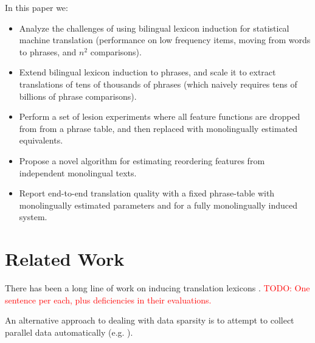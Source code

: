 \documentclass[11pt]{article}
\newcommand{\todo}[1]{\textcolor{red}{TODO: #1}}
\newcommand{\secref}[1]{Section~\ref{#1}}
\begin{document}

In this paper we:
\begin{itemize}
\item Analyze the challenges of using bilingual lexicon induction for statistical machine translation (performance on low frequency items, moving from words to phrases, and $n^2$ comparisons).
\item Extend bilingual lexicon induction to phrases, and scale it to extract translations of tens of thousands of  phrases (which naively requires tens of billions of phrase comparisons). 
\item Perform a set of lesion experiments where all feature functions are dropped from from a phrase table, and then replaced with monolingually estimated equivalents.
\item Propose a novel algorithm for estimating reordering features from independent monolingual texts.
\item Report end-to-end translation quality with a fixed phrase-table with monolingually estimated parameters and for a fully monolingually induced system.
\end{itemize}

\section{Related Work} \label{sect:related-work}

There has been a long line of work on inducing translation lexicons \cite{Rapp:1995,Rapp:1999}.
\todo{One sentence per each, plus deficiencies in their evaluations.}

An alternative approach to dealing with data sparsity is to attempt to collect parallel data automatically (e.g. \cite{Resnik:2003,Munteanu:2006,Smith:2010,Uszkoreit:2010}).
\end{document}
